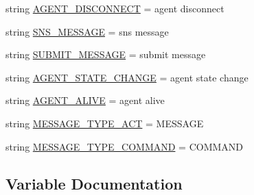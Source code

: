 \begin{DoxyCompactItemize}
string \hyperlink{namespaceparlai_1_1mturk_1_1core_1_1dev_1_1data__model_ab6ab4248336221d26281fb22ab727b3d}{A\+G\+E\+N\+T\+\_\+\+D\+I\+S\+C\+O\+N\+N\+E\+CT} = \textquotesingle{}agent disconnect\textquotesingle{}
\item 
string \hyperlink{namespaceparlai_1_1mturk_1_1core_1_1dev_1_1data__model_a43e093edc5e6aeacb586f12113ae268a}{S\+N\+S\+\_\+\+M\+E\+S\+S\+A\+GE} = \textquotesingle{}sns message\textquotesingle{}
\item 
string \hyperlink{namespaceparlai_1_1mturk_1_1core_1_1dev_1_1data__model_a5213b6e0f842a26732e07200094debc0}{S\+U\+B\+M\+I\+T\+\_\+\+M\+E\+S\+S\+A\+GE} = \textquotesingle{}submit message\textquotesingle{}
\item 
string \hyperlink{namespaceparlai_1_1mturk_1_1core_1_1dev_1_1data__model_a23ff3a132ebe933596d9675855bba7a2}{A\+G\+E\+N\+T\+\_\+\+S\+T\+A\+T\+E\+\_\+\+C\+H\+A\+N\+GE} = \textquotesingle{}agent state change\textquotesingle{}
\item 
string \hyperlink{namespaceparlai_1_1mturk_1_1core_1_1dev_1_1data__model_aea55e179512063c6e82933183edbbc4e}{A\+G\+E\+N\+T\+\_\+\+A\+L\+I\+VE} = \textquotesingle{}agent alive\textquotesingle{}
\item 
string \hyperlink{namespaceparlai_1_1mturk_1_1core_1_1dev_1_1data__model_a54f29cc8a3c119ca6c74b83bc857376b}{M\+E\+S\+S\+A\+G\+E\+\_\+\+T\+Y\+P\+E\+\_\+\+A\+CT} = \textquotesingle{}M\+E\+S\+S\+A\+GE\textquotesingle{}
\item 
string \hyperlink{namespaceparlai_1_1mturk_1_1core_1_1dev_1_1data__model_a04fb911d8dd6ce670b9dcadb28559eef}{M\+E\+S\+S\+A\+G\+E\+\_\+\+T\+Y\+P\+E\+\_\+\+C\+O\+M\+M\+A\+ND} = \textquotesingle{}C\+O\+M\+M\+A\+ND\textquotesingle{}
\end{DoxyCompactItemize}


\subsection{Variable Documentation}
\mbox{\label{namespaceparlai_1_1mturk_1_1core_1_1dev_1_1data__model_aea55e179512063c6e82933183edbbc4e}} 
